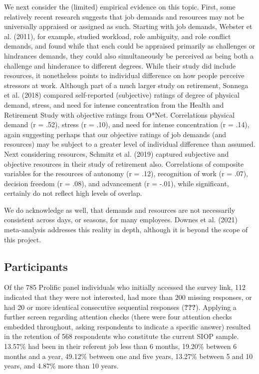\documentclass[
  english,
  man]{apa6}
\begin{document}
We next consider the (limited) empirical evidence on this topic. First, some relatively recent research suggests that job demands and resources may not be universally appraised or assigned as such. Starting with job demands, Webster et al. (2011), for example, studied workload, role ambiguity, and role conflict demands, and found while that each could be appraised primarily as challenges or hindrances demands, they could also simultaneously be perceived as being both a challenge and hinderance to different degrees. While their study did include resources, it nonetheless points to individual difference on how people perceive stressors at work. Although part of a much larger study on retirement, Sonnega et al. (2018) compared self-reported (subjective) ratings of degree of physical demand, stress, and need for intense concentration from the Health and Retirement Study with objective ratings from O*Net. Correlations physical demand (r = .52), stress (r = .10), and need for intense concentration (r = .14), again suggesting perhaps that our objective ratings of job demands (and resources) may be subject to a greater level of individual difference than assumed. Next considering resources, Schmitz et al. (2019) captured subjective and objective resources in their study of retirement also. Correlations of composite variables for the resources of autonomy (r = .12), recognition of work (r = .07), decision freedom (r = .08), and advancement (r = -.01), while significant, certainly do not reflect high levels of overlap.

We do acknowledge as well, that demands and resources are not necessarily consistent across days, or seasons, for many employees. Downes et al. (2021) meta-analysis addresses this reality in depth, although it is beyond the scope of this project.

\hypertarget{participants}{%
\subsection{Participants}\label{participants}}

Of the 785 Prolific panel individuals who initially accessed the survey link, 112 indicated that they were not interested, had more than 200 missing responses, or had 20 or more identical consecutive sequential responses ({\textbf{???}}). Applying a further screen regarding attention checks (there were four attention checks embedded throughout, asking respondents to indicate a specific answer) resulted in the retention of 568 respondents who constitute the current SIOP sample. 13.57\% had been in their referent job less than 6 months, 19.20\% between 6 months and a year, 49.12\% between one and five years, 13.27\% between 5 and 10 years, and 4.87\% more than 10 years.
\end{document}
